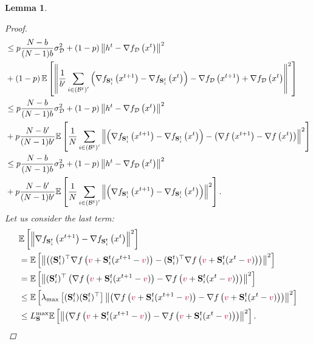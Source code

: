 \documentclass{article}
\newcommand{\shift}{{\color{purple}s}}
\newtheorem{lemma}{Lemma}
\theoremstyle{plain}
\renewcommand{\shift}{{\color{purple}v}}
\newcommand{\mS}{{\bf S}}
\theoremstyle{plain}
\theoremstyle{definition}
\theoremstyle{remark}
\begin{document}
\begin{lemma}
\begin{proof}
\begin{equation*}
\begin{split}
              &\leq p\frac{N-b}{(N-1)b} \sigma^2_{\mathcal{D}}+\left(1-p\right)\left\|h^t-\nabla f_{\mathcal{D}}\left(x^t\right)\right\|^2\\
              &+\left(1-p\right) \mathbb{E}\left[\left\|\frac{1}{b^{\prime}} \sum_{i \in \left(\mathcal{B}^{t}\right)^\prime}\left(\nabla f_{\mS^t_i}\left(x^{t+1}\right)-\nabla f_{\mS^t_i}\left(x^t\right)\right)-\nabla f_{\mathcal{D}}\left(x^{t+1}\right)+\nabla f_{\mathcal{D}}\left(x^t\right)\right\|^2\right]\\
              & \leq p\frac{N-b}{(N-1)b} \sigma^2_{\mathcal{D}}+\left(1-p\right)\left\|h^t-\nabla f_{\mathcal{D}}\left(x^t\right)\right\|^2\\
              &+p\frac{N-b^{\prime}}{(N-1)b^{\prime}} \mathbb{E}\left[\frac{1}{N}\sum_{i \in \left(\mathcal{B}^{t}\right)^\prime }\left\|\left(\nabla f_{\mS^t_i}\left(x^{t+1}\right)-\nabla f_{\mS^t_i}\left(x^t\right)\right)-\left(\nabla f\left(x^{t+1}\right)-\nabla f\left(x^t\right)\right)\right\|^2\right]\\
             & \leq p\frac{N-b}{(N-1)b} \sigma^2_{\mathcal{D}}+\left(1-p\right)\left\|h^t-\nabla f_{\mathcal{D}}\left(x^t\right)\right\|^2\\
             &+p\frac{N-b^{\prime}}{(N-1)b^{\prime}} \mathbb{E}\left[\frac{1}{N}\sum_{i \in \left(\mathcal{B}^{t}\right)^\prime }\left\|\left(\nabla f_{\mS^t_i}\left(x^{t+1}\right)-\nabla f_{\mS^t_i}\left(x^t\right)\right)\right\|^2\right].
    \end{split}
   \end{equation*}
   Let us consider the last term:
   \begin{align*}
&\mathbb{E}\left[\left\|\nabla f_{\mS^t_i}\left(x^{t+1}\right)-\nabla f_{\mS^t_i}\left(x^t\right)\right\|^2 \right] \\& = \mathbb{E}\left[\left\|\left( (\mS^t_i)^{\top} \nabla f\left( \shift+ \mS^t_i(x^{t+1} - \shift)\right)-(\mS^t_i)^{\top} \nabla f\left( \shift+ \mS^t_i(x^{t} - \shift)\right)\right)\right\|^2 \right] \\
&=\mathbb{E}\left[\left\| (\mS^t_i)^{\top} \left(\nabla f\left( \shift+ \mS^t_i(x^{t+1} - \shift)\right)-\nabla f\left( \shift+ \mS^t_i(x^{t} - \shift)\right)\right)\right\|^2 \right] \\
&\leq\mathbb{E}\left[ \lambda_{\max}\left[(\mS^t_i)(\mS^t_i)^{\top} \right]\left\|  \left(\nabla f\left( \shift+ \mS^t_i(x^{t+1} - \shift)\right)-\nabla f\left( \shift+ \mS^t_i(x^{t} - \shift)\right)\right)\right\|^2 \right] \\
&\leq L^{\max}_{\mS}\mathbb{E} \left[\left\|  \left(\nabla f\left( \shift+ \mS^t_i(x^{t+1} - \shift)\right)-\nabla f\left( \shift+ \mS^t_i(x^{t} - \shift)\right)\right)\right\|^2 \right].

\end{align*}
\end{proof}
\end{lemma}
\end{document}
